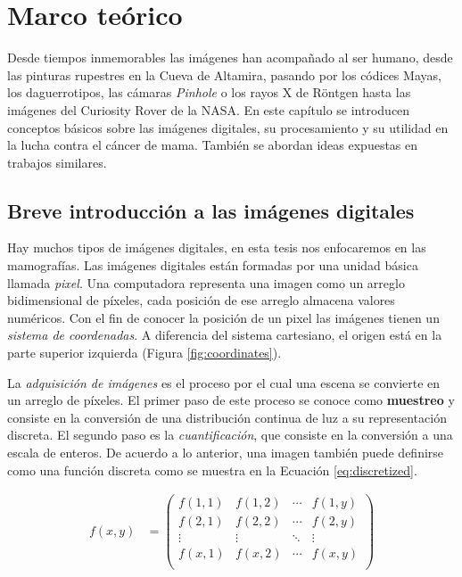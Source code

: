 \chapter{Marco teórico}
\label{marco}

Desde tiempos inmemorables las imágenes han acompañado al ser humano, desde las
pinturas rupestres en la Cueva de Altamira, pasando por los códices Mayas, los
daguerrotipos, las cámaras \textit{Pinhole} o los rayos X de Röntgen hasta las
imágenes del Curiosity Rover de la NASA. En este capítulo se introducen
conceptos básicos sobre las imágenes digitales, su procesamiento y su utilidad
en la lucha contra el cáncer de mama. También se abordan ideas expuestas en
trabajos similares.

\section{Breve introducción a las imágenes digitales}

Hay muchos tipos de imágenes digitales, en esta tesis nos enfocaremos en las
mamografías. Las imágenes digitales están formadas por una unidad básica
llamada \textit{pixel}. Una computadora representa una imagen como un arreglo
bidimensional de píxeles, cada posición de ese arreglo almacena valores
numéricos. Con el fin de conocer la posición de un pixel las imágenes tienen un
\textit{sistema de coordenadas}. A diferencia del sistema cartesiano, el origen
está en la parte superior izquierda (Figura \ref{fig:coordinates}). 

\shorthandoff{>} %
    
\shorthandon{>} 

La \textit{adquisición de imágenes} es el proceso por el cual una escena se
convierte en un arreglo de píxeles. El primer paso de este proceso se conoce
como \textbf{muestreo} y consiste en la conversión de una distribución continua
de luz a su representación discreta. El segundo paso es la
\textit{cuantificación}, que consiste en la conversión a una escala de enteros.
De acuerdo a lo anterior, una imagen también puede definirse como una función
discreta como se muestra en la Ecuación \ref{eq:discretized}. 


\begin{equation}
\label{eq:discretized}
    \begin{split}
            f(x,y) & = 
            \begin{pmatrix}
                f(1,1) & f(1,2) & \cdots & f(1,y) \\
                f(2,1) & f(2,2) & \cdots & f(2,y) \\
                \vdots & \vdots & \ddots & \vdots \\
                f(x,1) & f(x,2) & \cdots & f(x,y) \\
            \end{pmatrix}
    \end{split}
\end{equation}

